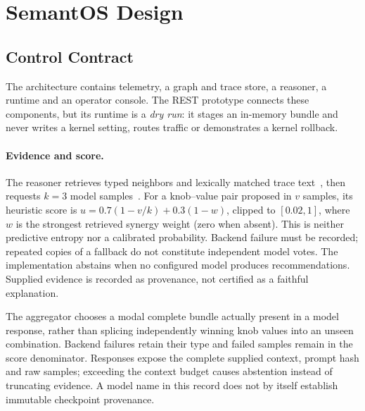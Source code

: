 \section{SemantOS Design}
\label{sec:semantos}
\subsection{Control Contract}
The architecture contains telemetry, a graph and trace store, a reasoner, a runtime and an operator console. The REST prototype connects these components, but its runtime is a \emph{dry run}: it stages an in-memory bundle and never writes a kernel setting, routes traffic or demonstrates a kernel rollback.

\paragraph{Evidence and score.}
The reasoner retrieves typed neighbors and lexically matched trace text~\cite{Lewis2020RAG}, then requests $k=3$ model samples~\cite{Wang2023SelfConsistency}. For a knob--value pair proposed in $v$ samples, its heuristic score is
$u=0.7(1-v/k)+0.3(1-w)$, clipped to $[0.02,1]$, where $w$ is the strongest retrieved synergy weight (zero when absent). This is neither predictive entropy nor a calibrated probability. Backend failure must be recorded; repeated copies of a fallback do not constitute independent model votes. The implementation abstains when no configured model produces recommendations. Supplied evidence is recorded as provenance, not certified as a faithful explanation.

The aggregator chooses a modal complete bundle actually present in a model response, rather than splicing independently winning knob values into an unseen combination. Backend failures retain their type and failed samples remain in the score denominator. Responses expose the complete supplied context, prompt hash and raw samples; exceeding the context budget causes abstention instead of truncating evidence. A model name in this record does not by itself establish immutable checkpoint provenance.

